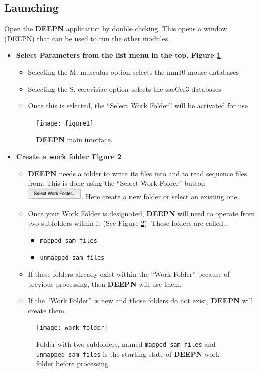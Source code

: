 \documentclass[11pt,fleqn]{book} %
\newcommand{\DEEPN}{\textbf{DEEPN }}
\begin{document}
\subsection{Launching}
Open the \DEEPN application by double clicking. This opens a window (DEEPN) that can be used to run the other modules.
\begin{itemize}
	\item[\textbf{Step 1.}] \textbf{Select Parameters from the list menu in the top. Figure \ref{fig:deepn_main_window}}
	\begin{itemize}
		\item Selecting the M. musculus option selects the mm10 mouse databases
		\item Selecting the S. cerevisiae option selects the sacCer3 databases
		\item Once this is selected, the “Select Work Folder” will be activated for use
	\end{itemize}
	\begin{figure}[!ht]
	    \centering
	    \texttt{[image: figure1]}
	    \caption{\DEEPN main interface.}
	    \label{fig:deepn_main_window}
    \end{figure}
	\item[\textbf{Step 2.}] \textbf{Create a work folder Figure \ref{fig:select_work_folder}}

	\begin{itemize}
		\item \DEEPN needs a folder to write its files into and to read sequence files from.  This is done using the ``Select Work Folder'' button \includegraphics[width=80pt]{Pictures/work_folder_btn}. Here create a new folder or select an existing one.
		\item Once your Work Folder is designated, \DEEPN will need to operate from two subfolders within it (See Figure \ref{fig:select_work_folder}). These folders are called...
		\begin{itemize}
			\item \texttt{mapped\_sam\_files}
			\item \texttt{unmapped\_sam\_files} 
		\end{itemize}
		\item If these folders already exist within the ``Work Folder'' because of previous processing, then \DEEPN will use them.
		\item If the ``Work Folder'' is new and those folders do not exist, \DEEPN will create them.
	\end{itemize}
	\begin{figure}[!ht]
	    \centering
	    \texttt{[image: work\_folder]}
	    \caption{Folder with two subfolders, named \texttt{mapped\_sam\_files} and \texttt{unmapped\_sam\_files} is the starting state of \DEEPN work folder before processing.}
	    \label{fig:select_work_folder}
    \end{figure}


\end{itemize}
\end{document}
